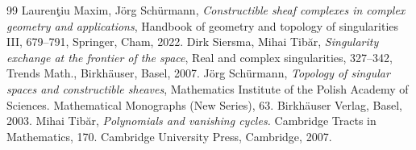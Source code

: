 \documentclass[10pt,a4paper]{amsart}
\numberwithin{equation}{section}  %
\begin{document}
\begin{thebibliography}{99}
 Lauren\c{t}iu Maxim, J\"org Sch\"urmann, {\it Constructible sheaf complexes in complex geometry and applications}, Handbook of geometry and topology of singularities III, 679--791, Springer, Cham, 2022.
 Dirk Siersma, Mihai Tib\u{a}r, {\it Singularity exchange at the frontier of the space}, Real and complex singularities, 327--342, Trends Math., Birkh\"auser, Basel, 2007.
 J\"org Sch\"urmann, {\it Topology of singular spaces and constructible sheaves}, Mathematics Institute of the Polish Academy of Sciences. Mathematical Monographs (New Series), 63. Birkh\"auser Verlag, Basel, 2003.
 Mihai Tib\u{a}r, {\it Polynomials and vanishing cycles.} Cambridge Tracts in Mathematics, 170. Cambridge University Press, Cambridge, 2007.
\end{thebibliography}
\end{document}
